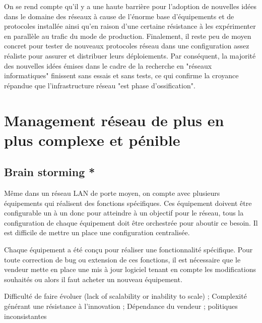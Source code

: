 \par
On se rend compte qu'il y a une haute barrière pour l'adoption de nouvelles idées dans le domaine des réseaux à cause de l'énorme base d'équipements et de protocoles installée ainsi qu'en raison d'une certaine résistance à les expérimenter en parallèle au trafic du mode de production. Finalement, il reste peu de moyen concret pour tester de nouveaux protocoles réseau dans une configuration assez réaliste pour assurer et distribuer leurs déploiements. Par conséquent, la majorité des nouvelles idées émises dans le cadre de la recherche en "réseaux informatiques" finissent sans essais et sans tests, ce qui confirme la croyance répandue que l'infrastructure réseau "est phase d'ossification". \cite{OpenFlowStanfordOssification} 



\section{Management réseau de plus en plus complexe et pénible }

\subsection*{Brain storming *}

Même dans un réseau LAN de porte moyen,  on compte avec plusieurs équipements qui réalisent des fonctions spécifiques. Ces équipement doivent être configurable un à un donc pour atteindre à un objectif pour le réseau, tous la configuration de chaque équipement doit être orchestrée pour aboutir ce besoin. Il est difficile de mettre un place une configuration centralisée.

\par
Chaque équipement a été conçu pour réaliser une fonctionnalité spécifique. Pour toute correction de bug ou extension de ces fonctions,  il est nécessaire que le vendeur mette en place une mis à jour logiciel tenant en compte les modifications souhaités ou alors il faut acheter un nouveau équipement. 

\par Difficulté de faire évoluer (lack of scalability or inability to scale) ; Complexité générant une résistance à l'innovation ; Dépendance du vendeur ; politiques inconsistantes


